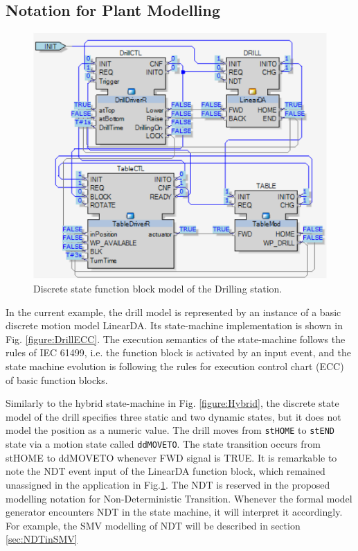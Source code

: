 \begin{bibunit}
\subsection{Notation for Plant Modelling}

\begin{figure}[h]
    \centering
    \includegraphics[scale = 0.65]{MX_Papers/Paper2/images/VerificationFB.png}
    \caption{Discrete state function block model of the Drilling station.}
    \label{figure:FBver}
\end{figure}

In the current example, the drill model is represented by an instance of a basic discrete motion model LinearDA. 
Its state-machine implementation is shown in Fig. \ref{figure:DrillECC}. The execution semantics of the state-machine follows the rules of IEC 61499, i.e. the function block is activated by an input event, and the state machine evolution is following the rules for execution control chart (ECC) of basic function blocks. 

Similarly to the hybrid state-machine in Fig. \ref{figure:Hybrid}, the discrete state model of the drill specifies three static and two dynamic states, but it does not model the position as a numeric value. The drill moves from \texttt{stHOME} to \texttt{stEND} state via a motion state called \texttt{ddMOVETO}. The state transition occurs from stHOME to ddMOVETO whenever FWD signal is TRUE. 
It is remarkable to note the NDT event input of the LinearDA function block, which remained unassigned in the application in Fig.\ref{figure:FBver}.
The NDT is reserved in the proposed modelling notation for Non-Deterministic Transition. 
Whenever the formal model generator encounters NDT in the state machine, it will interpret it accordingly. For example, the SMV modelling of NDT will be described in section \ref{sec:NDTinSMV} 


\end{bibunit}
